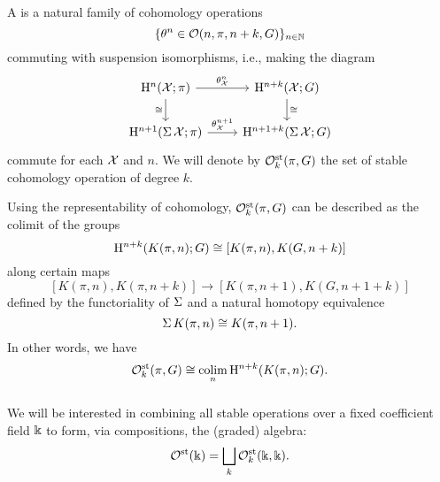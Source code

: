 \subsubsection{} A  is a natural family of cohomology operations
\[
\{\theta^n \in \mathcal{O}(n,\pi,n+k,G)\}_{n \in \mathbb{N}}
\]
commuting with suspension isomorphisms, i.e., making the diagram
\[
\begin{tikzcd}
	\rH^n(\cX; \pi) \rar["\theta^n_\cX"] \dar["\cong" left] & \rH^{n+k}(\cX; G) \dar["\cong" right] \\
	\rH^{n+1}(\sus \cX; \pi) \rar["\theta^{n+1}_\cX"] & \rH^{n+1+k}(\sus \cX; G)
\end{tikzcd}
\]
commute for each \(\mathcal{X}\) and $n$.
We will denote by $\mathcal{O}^{\mathrm{st}}_k(\pi, G)$ the set of stable cohomology operation of degree $k$.


Using the representability of cohomology, $\mathcal{O}^{\mathrm{st}}_k(\pi, G)$ can be described as the colimit of the groups
\[
\mathrm{H}^{n+k}(K(\pi, n); G) \cong [K(\pi, n), K(G, n+k)]
\]
along certain maps
\[
[K(\pi, n), K(\pi, n+k)] \to [K(\pi, n+1), K(G, n+1+k)]
\]
defined by the functoriality of $\operatorname{\Sigma}$ and a natural homotopy equivalence
\begin{equation}\label{eq:suspension of K(pi,n)}
	\operatorname{\Sigma} K(\pi, n) \cong K(\pi, n+1).
\end{equation}
In other words, we have
\[
\mathcal{O}^{\mathrm{st}}_k(\pi, G) \cong \operatorname*{colim}_n \mathrm{H}^{n+k}(K(\pi, n); G).
\]

\subsubsection{} We will be interested in combining all stable operations over a fixed coefficient field $\Bbbk$ to form, via compositions, the (graded) algebra:
\[
\mathcal{O}^{\mathrm{st}}(\Bbbk) = \bigsqcup_k \mathcal{O}^{\mathrm{st}}_k(\Bbbk, \Bbbk).
\]

